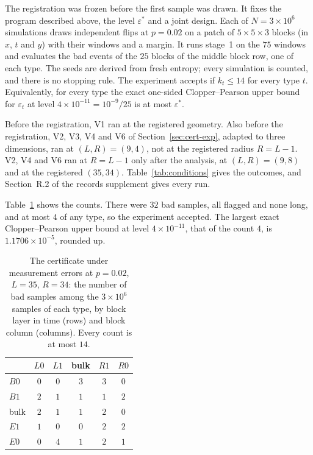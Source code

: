 \documentclass[11pt]{amsart}
\theoremstyle{definition}
\theoremstyle{remark}
\numberwithin{equation}{section}
\begin{document}
The registration was frozen before the first sample was drawn. It fixes the program described above, the level $\varepsilon^\ast$ and a joint design. Each of $N=3\times10^{6}$ simulations draws independent flips at $p=0.02$ on a patch of $5\times5\times3$ blocks (in $x$, $t$ and $y$) with their windows and a margin. It runs stage~1 on the $75$ windows and evaluates the bad events of the $25$ blocks of the middle block row, one of each type. The seeds are derived from fresh entropy; every simulation is counted, and there is no stopping rule. The experiment accepts if $k_t\le14$ for every type $t$. Equivalently, for every type the exact one-sided Clopper--Pearson upper bound for $\varepsilon_t$ at level $4\times10^{-11}=10^{-9}/25$ is at most $\varepsilon^\ast$.

Before the registration, V1 ran at the registered geometry. Also before the registration, V2, V3, V4 and V6 of Section~\ref{sec:cert-exp}, adapted to three dimensions, ran at $(L,R)=(9,4)$, not at the registered radius $R=L-1$. V2, V4 and V6 ran at $R=L-1$ only after the analysis, at $(L,R)=(9,8)$ and at the registered $(35,34)$. Table~\ref{tab:conditions} gives the outcomes, and Section~R.2 of the records supplement gives every run.

Table~\ref{tab:cert-meas} shows the counts. There were $32$ bad samples, all flagged and none long, and at most $4$ of any type, so the experiment accepted. The largest exact Clopper--Pearson upper bound at level $4\times10^{-11}$, that of the count $4$, is $1.1706\times10^{-5}$, rounded up.

\begin{table}[ht]
\centering
\begin{tabular}{@{}lccccc@{}}
\toprule
& $L0$ & $L1$ & bulk & $R1$ & $R0$ \\
\midrule
$B0$ & $0$ & $0$ & $3$ & $3$ & $0$ \\
$B1$ & $2$ & $1$ & $1$ & $1$ & $2$ \\
bulk & $2$ & $1$ & $1$ & $2$ & $0$ \\
$E1$ & $1$ & $0$ & $0$ & $2$ & $2$ \\
$E0$ & $0$ & $4$ & $1$ & $2$ & $1$ \\
\bottomrule
\end{tabular}
\caption{The certificate under measurement errors at $p=0.02$, $L=35$, $R=34$: the number of bad samples among the $3\times10^{6}$ samples of each type, by block layer in time (rows) and block column (columns). Every count is at most $14$.}
\label{tab:cert-meas}
\end{table}
\end{document}

